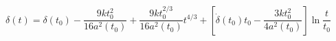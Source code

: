 \begin{equation}\label{deltageneral4}
\delta(t)=\delta(t_0)-\frac{9kt_0^{2}}{16a^2(t_0)}+\frac{9kt_0^{2/3}}{16a^2(t_0)}t^{4/3}+[\dot{\delta}(t_0)t_0-\frac{3kt_0^{2}}{4a^2(t_0)}]\ln
\frac{t}{t_0}
\end{equation}

